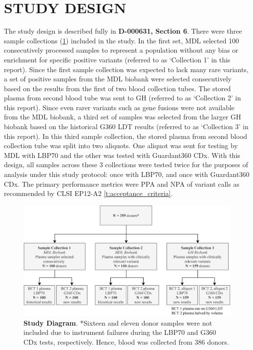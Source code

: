 \documentclass[12pt]{protocol}
\begin{document}
\section{STUDY DESIGN}

The study design is described fully in \textbf{D-000631, Section 6}. There were three sample
collections (\cref{f:study_diagram}) included in the study. In the first set, MDL selected 100
consecutively processed samples to represent a population without any bias or enrichment for
specific positive variants (referred to as `Collection 1' in this report). Since the first sample
collection was expected to lack many rare variants, a set of positive samples from the MDL biobank
were selected consecutively based on the results from the first of two blood collection tubes. The
stored plasma from second blood tube was sent to GH (referred to as `Collection 2' in this report).
Since even rarer variants such as gene fusions were not available from the MDL biobank, a third set
of samples was selected from the larger GH biobank based on the historical G360 LDT results
(referred to as `Collection 3' in this report). In this third sample collection, the stored plasma
from second blood collection tube was split into two aliquots. One aliquot was sent for testing by
MDL with LBP70 and the other was tested with Guardant360 CDx. With this design, all samples across
these 3 collections were tested twice for the purposes of analysis under this study protocol: once
with LBP70, and once with Guardant360 CDx. The primary performance metrics were PPA and NPA of
variant calls as recommended by CLSI EP12-A2 \cref{t:acceptance_criteria}.


\captionsetup{width=.75\textwidth}
\begin{figure}
    \centering
    \includegraphics{figures/study_workflow.png}
    \caption{\textbf{Study Diagram}. *Sixteen and eleven donor samples were not included due to 
    instrument failures during the LBP70 and G360 CDx tests, respectively. Hence, blood was
    collected from 386 donors.}\label{f:study_diagram}
\end{figure}
\end{document}
